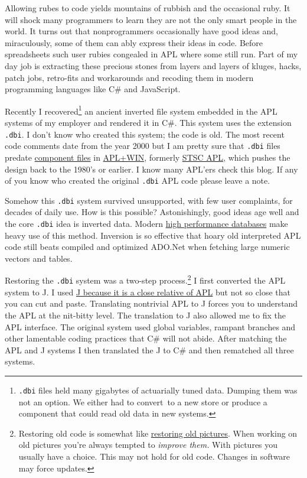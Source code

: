 Allowing rubes to code yields mountains of rubbish and the occasional
ruby. It will shock many programmers to learn they are not the only
smart people in the world. It turns out that nonprogrammers occasionally
have good ideas and, miraculously, some of them can ably express their
ideas in code. Before spreadsheets such user rubies congealed in APL
where some still run. Part of my day job is extracting these precious
stones from layers and layers of kluges, hacks, patch jobs, retro-fits
and workarounds and recoding them in modern programming languages like
C\# and JavaScript.

Recently I recovered\footnote{
\texttt{.dbi} files held many gigabytes of actuarially tuned data.
  Dumping them was not an option. We either had to convert~to a new
  store or produce a component that could read old data in new
  systems.
} an ancient
inverted file system embedded in the APL systems of my employer and
rendered it in C\#. This system uses the extension \texttt{.dbi}. I
don't know who created this system; the code is old. The most recent
code comments date from the year 2000 but I am pretty sure that
\texttt{.dbi} files predate
\href{http://dl.acm.org/citation.cfm?id=28339}{component files} in
\href{http://www.apl2000.com/}{APL+WIN}, formerly
\href{https://en.wikipedia.org/wiki/Scientific\_Time\_Sharing\_Corporation}{STSC
APL}, which pushes the design back to the 1980's or earlier. I know many
APL'ers check this blog. If any of you know who created the original
\texttt{.dbi} APL code please leave a note.

Somehow this \texttt{.dbi} system survived unsupported, with few user
complaints, for decades of daily use. How is this possible?
Astonishingly, good ideas age well and the core \texttt{.dbi} idea is
inverted data. Modern \href{http://kx.com/}{high performance databases}
make heavy use of this method. Inversion is so effective that hoary old
interpreted APL code still beats compiled and optimized ADO.Net when
fetching large numeric vectors and tables.

Restoring the \texttt{.dbi} system was a two-step
process.\footnote{
Restoring old code is somewhat like
  \href{http://conceptcontrol.smugmug.com/Themes/Manipulations/Restorations-1}{restoring
  old pictures}. When working on old pictures you're always tempted to
  \emph{improve them.} With pictures you usually have a choice. This may
  not hold for old code. Changes in software may force
  updates.
} I first converted the APL
system to J. I used \href{http://www.jsoftware.com/jwiki/FrontPage}{J
because it is a close relative of APL} but not so close that you can cut
and paste. Translating nontrivial APL to J forces you to understand the
APL at the nit-bitty level. The translation to J also allowed me to fix
the APL interface. The original system used global variables, rampant
branches and other lamentable coding practices that C\# will not abide.
After matching the APL and J systems I then translated the J to C\# and
then rematched all three systems.

